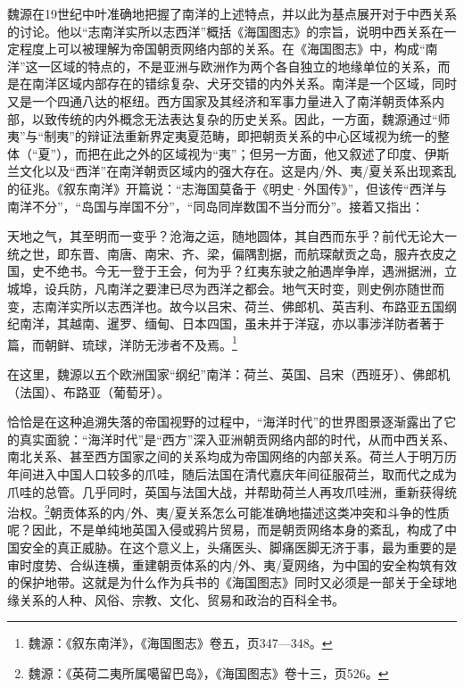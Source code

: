 \documentclass[a4paper, 12pt, openright]{ctexbook}
\renewenvironment{quote}
  {\list{}{\rightmargin2\ccwd \leftmargin2\ccwd \itemindent=2\ccwd \listparindent=2\ccwd}%
   \item\relax\small\kaishu\color{black}}
  {\endlist}
\begin{document}
魏源在19世纪中叶准确地把握了南洋的上述特点，并以此为基点展开对于中西关系的讨论。他以“志南洋实所以志西洋”概括《海国图志》的宗旨，说明中西关系在一定程度上可以被理解为帝国朝贡网络内部的关系。在《海国图志》中，构成“南洋”这一区域的特点的，不是亚洲与欧洲作为两个各自独立的地缘单位的关系，而是在南洋区域内部存在的错综复杂、犬牙交错的内外关系。南洋是一个区域，同时又是一个四通八达的枢纽。西方国家及其经济和军事力量进入了南洋朝贡体系内部，以致传统的内外概念无法表达复杂的历史关系。因此，一方面，魏源通过“师夷”与“制夷”的辩证法重新界定夷夏范畴，即把朝贡关系的中心区域视为统一的整体（“夏”），而把在此之外的区域视为“夷”；但另一方面，他又叙述了印度、伊斯兰文化以及“西洋”在南洋朝贡区域内的强大存在。这是内/外、夷/夏关系出现紊乱的征兆。《叙东南洋》开篇说：“志海国莫备于《明史·外国传》”，但该传“西洋与南洋不分”，“岛国与岸国不分”，“同岛同岸数国不当分而分”。接着又指出：

\begin{quote}
天地之气，其至明而一变乎？沧海之运，随地圆体，其自西而东乎？前代无论大一统之世，即东晋、南唐、南宋、齐、梁，偏隅割据，而航琛献贡之岛，服卉衣皮之国，史不绝书。今无一登于王会，何为乎？红夷东驶之舶遇岸争岸，遇洲据洲，立城埠，设兵防，凡南洋之要津已尽为西洋之都会。地气天时变，则史例亦随世而变，志南洋实所以志西洋也。故今以吕宋、荷兰、佛郎机、英吉利、布路亚五国纲纪南洋，其越南、暹罗、缅甸、日本四国，虽未并于洋寇，亦以事涉洋防者著于篇，而朝鲜、琉球，洋防无涉者不及焉。\footnote{魏源：《叙东南洋》，《海国图志》卷五，页347—348。}
\end{quote}

在这里，魏源以五个欧洲国家“纲纪”南洋：荷兰、英国、吕宋（西班牙）、佛郎机（法国）、布路亚（葡萄牙）。

恰恰是在这种追溯失落的帝国视野的过程中，“海洋时代”的世界图景逐渐露出了它的真实面貌：“海洋时代”是“西方”深入亚洲朝贡网络内部的时代，从而中西关系、南北关系、甚至西方国家之间的关系均成为帝国网络的内部关系。荷兰人于明万历年间进入中国人口较多的爪哇，随后法国在清代嘉庆年间征服荷兰，取而代之成为爪哇的总管。几乎同时，英国与法国大战，并帮助荷兰人再攻爪哇洲，重新获得统治权。\footnote{魏源：《英荷二夷所属噶留巴岛》，《海国图志》卷十三，页526。}朝贡体系的内/外、夷/夏关系怎么可能准确地描述这类冲突和斗争的性质呢？因此，不是单纯地英国入侵或鸦片贸易，而是朝贡网络本身的紊乱，构成了中国安全的真正威胁。在这个意义上，头痛医头、脚痛医脚无济于事，最为重要的是审时度势、合纵连横，重建朝贡体系的内/外、夷/夏网络，为中国的安全构筑有效的保护地带。这就是为什么作为兵书的《海国图志》同时又必须是一部关于全球地缘关系的人种、风俗、宗教、文化、贸易和政治的百科全书。
\end{document}
